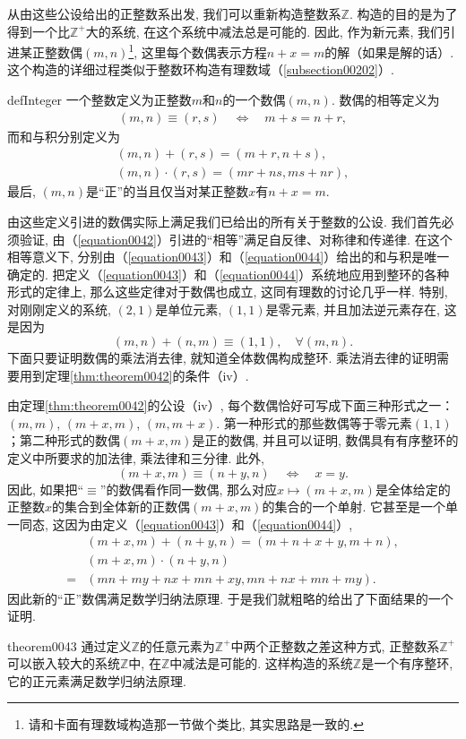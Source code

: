 从由这些公设给出的正整数系出发, 我们可以重新构造整数系$\mathbb{Z}$. 构造的目的是为了得到一个比$\mathbb{Z}^+$大的系统, 在这个系统中减法总是可能的. 因此, 作为新元素, 我们引进某正整数偶$(m,n)$\footnote{请和卡面有理数域构造那一节做个类比, 其实思路是一致的. }, 这里每个数偶表示方程$n+x=m$的解（如果是解的话）. 这个构造的详细过程类似于整数环构造有理数域（\ref{subsection00202}）. 
\begin{definition}{}{defInteger}
一个整数定义为正整数$m$和$n$的一个数偶$(m,n)$. 数偶的相等定义为
\begin{gather}\label{equation0042}
(m,n)\equiv(r,s) \quad\Leftrightarrow\quad m+s = n+ r,
\end{gather}
而和与积分别定义为
\begin{gather}
(m,n)+(r, s) = (m+r, n+s), \label{equation0043}\\
(m,n)\cdot(r,s)=(mr+ns, ms+nr),\label{equation0044}
\end{gather}
最后, $(m,n)$是“正”的当且仅当对某正整数$x$有$n+x=m$. 
\end{definition}

由这些定义引进的数偶实际上满足我们已给出的所有关于整数的公设. 我们首先必须验证, 由（\ref{equation0042}）引进的“相等”满足自反律、对称律和传递律. 在这个相等意义下, 分别由（\ref{equation0043}）和（\ref{equation0044}）给出的和与积是唯一确定的. 把定义（\ref{equation0043}）和（\ref{equation0044}）系统地应用到整环的各种形式的定律上, 那么这些定律对于数偶也成立, 这同有理数的讨论几乎一样. 特别, 对刚刚定义的系统, $(2,1)$是单位元素, $(1,1)$是零元素, 并且加法逆元素存在, 这是因为
\[
(m,n)+(n,m) \equiv (1,1),\quad \forall (m,n).
\]
下面只要证明数偶的乘法消去律, 就知道全体数偶构成整环. 乘法消去律的证明需要用到定理\ref{thm:theorem0042}的条件（iv）. 

由定理\ref{thm:theorem0042}的公设（iv）, 每个数偶恰好可写成下面三种形式之一：$(m,m)$, $(m+x, m)$, $(m, m+x)$. 第一种形式的那些数偶等于零元素$(1,1)$；第二种形式的数偶$(m+x,m)$是正的数偶, 并且可以证明, 数偶具有有序整环的定义中所要求的加法律, 乘法律和三分律. 此外, 
\[
(m+x, m) \equiv (n+y,n) \quad\Leftrightarrow\quad x=y.
\] 
因此, 如果把“$\equiv$”的数偶看作同一数偶, 那么对应$x \mapsto (m+x,m)$是全体给定的正整数$x$的集合到全体新的正数偶$(m+x, m)$的集合的一个单射. 它甚至是一个单一同态, 这因为由定义（\ref{equation0043}）和（\ref{equation0044}）, 
\[
\begin{aligned}
&(m+x, m) + (n+y, n) = (m+n+x+y,m+n),\\
&(m+x, m)\cdot(n+y, n)\\
=&(mn+my+nx+mn+xy, mn+nx+mn+my).
\end{aligned}
\]
因此新的“正”数偶满足数学归纳法原理. 于是我们就粗略的给出了下面结果的一个证明. 
\begin{theorem}{}{theorem0043}
通过定义$\mathbb{Z}$的任意元素为$\mathbb{Z}^+$中两个正整数之差这种方式, 正整数系$\mathbb{Z}^+$可以嵌入较大的系统$\mathbb{Z}$中, 在$\mathbb{Z}$中减法是可能的. 这样构造的系统$\mathbb{Z}$是一个有序整环, 它的正元素满足数学归纳法原理. 
\end{theorem}

